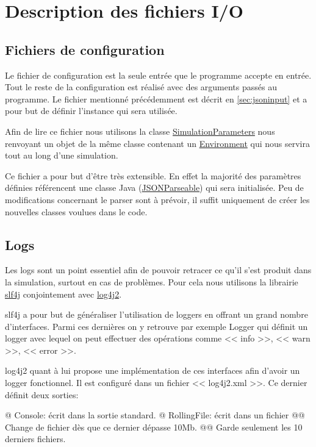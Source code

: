\documentclass[final]{polytech/polytech}
\newcommand{\klass}[1]{\hyperref[class:#1]{#1}}
\begin{document}
	\section{Description des fichiers I/O}
		\subsection{Fichiers de configuration}
			Le fichier de configuration est la seule entrée que le programme accepte en entrée.
			Tout le reste de la configuration est réalisé avec des arguments passés au programme.
			Le fichier mentionné précédemment est décrit en \autoref{sec:jsoninput} et a pour but de définir l'instance qui sera utilisée.
			
			Afin de lire ce fichier nous utilisons la classe \klass{SimulationParameters} nous renvoyant un objet de la même classe contenant un \klass{Environment} qui nous servira tout au long d'une simulation.
			
			Ce fichier a pour but d'être très extensible.
			En effet la majorité des paramètres définies référencent une classe Java (\klass{JSONParseable}) qui sera initialisée.
			Peu de modifications concernant le parser sont à prévoir, il suffit uniquement de créer les nouvelles classes voulues dans le code.
			
		\subsection{Logs}
			Les logs sont un point essentiel afin de pouvoir retracer ce qu'il s'est produit dans la simulation, surtout en cas de problèmes.
			Pour cela nous utilisons la librairie \href{https://www.slf4j.org/}{slf4j} conjointement avec \href{https://logging.apache.org/log4j/2.x/}{log4j2}.
			
			slf4j a pour but de généraliser l'utilisation de loggers en offrant un grand nombre d'interfaces.
			Parmi ces dernières on y retrouve par exemple Logger qui définit un logger avec lequel on peut effectuer des opérations comme << info >>, << warn >>, << error >>.
			
			log4j2 quant à lui propose une implémentation de ces interfaces afin d'avoir un logger fonctionnel.
			Il est configuré dans un fichier << log4j2.xml >>.
			Ce dernier définit deux sorties:
			\begin{easylist}
				@ Console: écrit dans la sortie standard.
				@ RollingFile: écrit dans un fichier
				@@ Change de fichier dès que ce dernier dépasse 10Mb.
				@@ Garde seulement les 10 derniers fichiers.
			\end{easylist}
			
\end{document}
